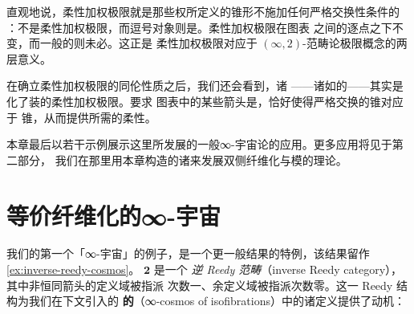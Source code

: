 直观地说，柔性加权极限就是那些权所定义的锥形不施加任何严格交换性条件的%
\trLimit{}：\trPullback{}不是柔性加权极限，而逗号对象则是。柔性加权极限在图表
之间的逐点\trEquivalence{}之下不变，而一般的\trWeightedLimit{}则未必。这正是
柔性加权极限对应于 $(\infty,2)$-范畴论极限概念的两层意义。

在确立柔性加权极限的同伦性质之后，我们还会看到，诸\trCosmologicalLimitNotions{}%
——诸如\trIsofibration{}的\trPullback{}——其实是化了装的柔性加权极限。要求
图表中的某些箭头是\trIsofibration，恰好使得严格交换的锥对应于%
\trPseudoCommutative{}锥，从而提供所需的柔性。

本章最后以若干示例展示这里所发展的一般∞-宇宙论的应用。更多应用将见于第二部分，
我们在那里用本章构造的诸\trInfinityCosmos{}来发展双侧纤维化与模的理论。

\providecommand{\Fun}{\operatorname{Fun}}
\providecommand{\qcOne}{\mathbf{1}}   %
\providecommand{\qcTwo}{\mathbf{2}}   %
\providecommand{\twoheaddownarrow}{\rotatebox[origin=c]{270}{$\twoheadrightarrow$}}   %

\section{等价纤维化的∞-宇宙}\label{sec:isofibration-cosmos}

我们的第一个「\trExotic{}∞-宇宙」的例子，是一个更一般结果的特例，该结果留作%
\cref{ex:inverse-reedy-cosmos}。\trWalkingArrow{}\trCategory{} $\qcTwo$ 是一个%
\emph{逆 Reedy 范畴}（inverse Reedy category），其中非恒同箭头的定义域被指派
次数一、余定义域被指派次数零。这一 Reedy 结构为我们在下文引入的%
\textbf{\trIsofibration{}的\trInfinityCosmos}（∞-cosmos of isofibrations）中的诸定义提供了动机：

